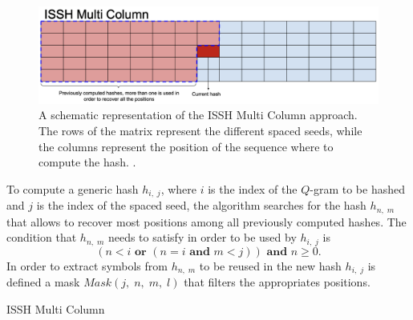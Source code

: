 \begin{figure}[!ht]
	\centering
	\includegraphics[width=0.85\linewidth]{images/issh_multi_column}
	\caption{A schematic representation of the ISSH Multi Column approach. The rows of the matrix represent the different spaced seeds, while the columns represent the position of the sequence where to compute the hash. \cite{mian2023missh}.}
	\label{fig:issh_multi_column}
\end{figure}

To compute a generic hash $h_{i,\; j}$, where $i$ is the index of the $Q$-gram to be hashed and $j$ is the index of the spaced seed, the algorithm searches for the hash $h_{n,\; m}$ that allows to recover most positions among all previously computed hashes. The condition that $h_{n,\; m}$ needs to satisfy in order to be used by $h_{i,\; j}$ is \begin{equation}\label{eq:issh_multi_column_condition}
	(n < i \textbf{ or } (n = i \textbf{ and } m < j)) \textbf{ and } n \geq 0.
\end{equation}
In order to extract symbols from $h_{n,\; m}$ to be reused in the new hash $h_{i,\; j}$ is defined a mask $Mask(j,\; n,\; m,\; l)$ that filters the appropriates positions.

\begin{algorithm}[!ht]
	\caption{ISSH Multi Column}
	\label{alg:ISSH_multi_column}
\end{algorithm}

